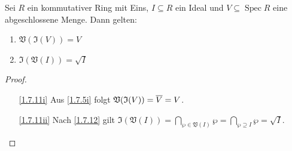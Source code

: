 \documentclass[a4paper,12pt,index=toc]{scrbook}
\theoremstyle{keinenummern} %
\def\V{\mathfrak{V}}
\def\I{\mathfrak{I}}
\newcommand{\Spec}{\operatorname{Spec}}
\def\Bar#1{\ensuremath\overline{#1}}
\begin{document}
\begin{prop}\label{1.7.11}
  Sei $R$ ein kommutativer Ring mit Eins, $I\subseteq R$ ein Ideal und $V\subseteq\Spec R$ eine abgeschlossene Menge. Dann
  gelten:
  \begin{enumerate}
  \item{} $\V(\I(V))=V$
  \item{} $\I(\V(I))=\sqrt{I}$
  \end{enumerate}
\end{prop}
\begin{proof}
  \begin{enumerate}
  \item[\ref{1.7.11i}] Aus \cref{1.7.5i} folgt $\V(\I(V))=\Bar{V}=V$.
  \item[\ref{1.7.11ii}] Nach \cref{1.7.12} gilt $\displaystyle\I(\V(I))=\!\!\bigcap_{\wp\in\V(I)}\!\!\wp=\bigcap_{\wp\supseteq I}\wp=\sqrt{I}$.
  \end{enumerate}
\end{proof}
\end{document}
